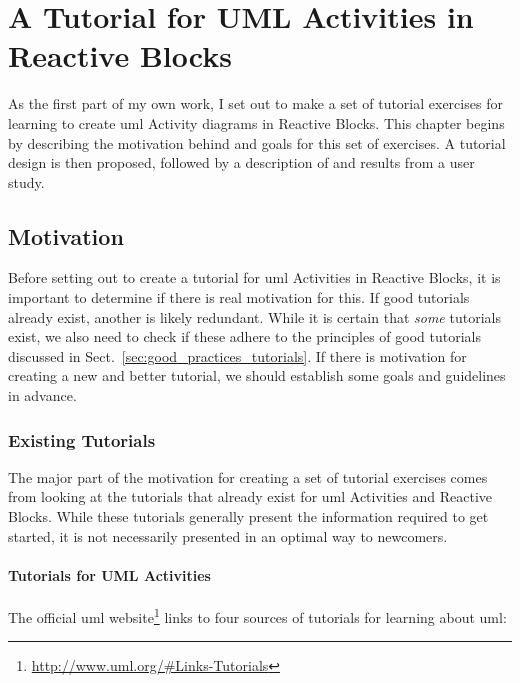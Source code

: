 \chapter{A Tutorial for UML Activities in Reactive Blocks}
\label{ch:reactive_blocks_tutorial}
As the first part of my own work, I set out to make a set of tutorial exercises for learning to create \gls{uml} Activity diagrams in Reactive Blocks. This chapter begins by describing the motivation behind and goals for this set of exercises. A tutorial design is then proposed, followed by a description of and results from a user study.

\section{Motivation}
\label{sec:tutorial_motivation}
Before setting out to create a tutorial for \gls{uml} Activities in Reactive Blocks, it is important to determine if there is real motivation for this. If good tutorials already exist, another is likely redundant. While it is certain that \emph{some} tutorials exist, we also need to check if these adhere to the principles of good tutorials discussed in Sect.~\ref{sec:good_practices_tutorials}. If there is motivation for creating a new and better tutorial, we should establish some goals and guidelines in advance.

\subsection{Existing Tutorials}
\label{sec:existing_tutorials}
The major part of the motivation for creating a set of tutorial exercises comes from looking at the tutorials that already exist for \gls{uml} Activities and Reactive Blocks. While these tutorials generally present the information required to get started, it is not necessarily presented in an optimal way to newcomers.

\subsubsection{Tutorials for UML Activities}
The official \gls{uml} website\footnote{\url{http://www.uml.org/\#Links-Tutorials}} links to four sources of tutorials for learning about \gls{uml}:

